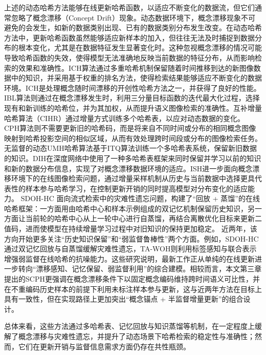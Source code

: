 上述的动态哈希方法能够在线更新哈希函数，以适应不断变化的数据流，但它们通常忽略了概念漂移（Concept Drift）现象。动态数据环境下，概念漂移现象不可避免的会发生，如新的数据类别出现、已有的数据类别分布发生改变。在动态哈希方法中，更新哈希函数虽然能够适应新样本的加入，但往往无法及时捕捉到数据分布的根本变化，尤其是在数据特征发生显著变化时。这种忽视概念漂移的情况可能导致哈希函数的失效，使得模型无法准确地反映当前数据的特征分布，从而影响检索的效果和准确性。ICH算法通过多重哈希机制保留随着时间推移到达的新图像数据中的知识，并采用基于权重的排名方法，使得检索结果能够适应不断变化的数据环境。ICH是处理概念随时间漂移的开创性哈希方法之一，并获得了良好的性能。IBL算法则通过在概念漂移发生时，利用三分量目标函数的迭代最大化过程，选择现有和新训练的哈希位，并为其加权，从而提升语义图像检索的准确性。互补增量哈希算法（CIHR）通过增量方式训练多个哈希表，以应对动态数据的变化。
CPH算法则不需要更新旧的哈希码，而是将来自不同时间或分布的相同概念图像映射到哈希投影空间的相似区域，从而有效处理跨时间段或分布的图像检索任务。
无监督的动态UMH哈希算法基于ITQ算法训练一个多哈希表系统，保留新旧数据的知识。DIH在深度网络中使用了一种多哈希表框架来同时保留并学习以前的知识和新的数据分布信息，实现了对概念漂移数据环境的适应。ISH进一步面向概念漂移环境下的在线图像检索问题，通过增量采样机制从历史与当前数据中选择更具代表性的样本参与哈希学习，在控制更新开销的同时提高模型对分布变化的适应能力。
SDOH-HC 面向流式检索中的灾难性遗忘问题，构建了“回放 + 蒸馏”的在线哈希框架：一方面用由哈希中心和样本示例组成的双记忆机制保留历史知识，另一方面让当前轮的哈希中心从上一轮中心进行自蒸馏，再结合离散优化目标来更新二值码，进而使模型在持续增量学习过程中对旧知识的保持更加稳定。
近两年，该方向开始更多关注“历史知识保留”和“弱监督鲁棒性”两个方面。例如，SDOH-HC通过双记忆回放与自蒸馏缓解灾难性遗忘，TA-WOH则利用标签感知与联合表示增强弱监督在线哈希的抗噪能力。这些研究说明，最新工作正从单纯的在线更新进一步转向“漂移感知、记忆保留、弱监督利用”的综合建模。相较而言，本文第三章提出的SCPH更强调在概念漂移条件下以固定概念编码维持跨时间语义可比性，并在不重编码历史样本的前提下利用未标注样本参与更新，这与近两年方法在目标上具有一致性，但在实现路径上更加突出“概念锚点 + 半监督增量更新”的组合设计。

总体来看，这些方法通过多哈希表、记忆回放与知识蒸馏等机制，在一定程度上缓解了概念漂移与灾难性遗忘，并提升了动态场景下哈希检索的稳定性与准确性；然而，它们在更新开销与监督信息需求方面仍存在共性瓶颈。

